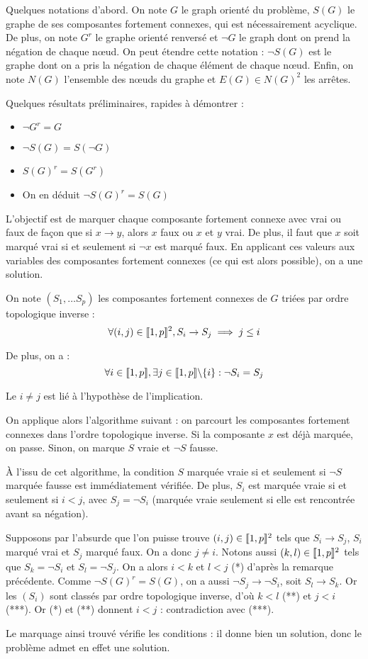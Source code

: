 Quelques notations d'abord. On note $G$ le graph orienté du problème, $S(G)$ le
graphe de ses composantes fortement connexes, qui est nécessairement acyclique.
De plus, on note $G^r$ le graphe orienté renversé et $\neg G$ le graph dont on
prend la négation de chaque nœud. On peut étendre cette notation : $\neg S(G)$
est le graphe dont on a pris la négation de chaque élément de chaque nœud.
Enfin, on note $N(G)$ l'ensemble des nœuds du graphe et $E(G) \in N(G)^2$ les
arrêtes.

Quelques résultats préliminaires, rapides à démontrer :
\begin{itemize}
 \item $\neg G^r = G$
 \item $\neg S(G) = S(\neg G)$
 \item $S(G)^r = S(G^r)$
 \item On en déduit $\neg S(G)^r = S(G)$
\end{itemize}

L'objectif est de marquer chaque composante fortement connexe avec vrai ou faux
de façon que si $x \rightarrow y$, alors $x$ faux ou $x$ et $y$ vrai. De plus,
il faut que $x$ soit marqué vrai si et seulement si $\neg x$ est marqué faux.
En applicant ces valeurs aux variables des composantes fortement connexes
(ce qui est alors possible), on a une solution.

On note $(S_1,\ldots S_p)$ les composantes fortement connexes de $G$ triées par
ordre topologique inverse :
    \[ \forall (i,j)\in\llbracket 1, p \rrbracket^2, S_i \rightarrow S_j \implies j \leq i \]

De plus, on a :
    \[ \forall i\in\llbracket 1, p \rrbracket, \exists j\in\llbracket 1, p \rrbracket\backslash\{i\}: \neg S_i = S_j \]

Le $i\neq j$ est lié à l'hypothèse de l'implication.

On applique alors l'algorithme suivant : on parcourt les composantes fortement
connexes dans l'ordre topologique inverse. Si la composante $x$ est déjà
marquée, on passe. Sinon, on marque $S$ vraie et $\neg S$ fausse.

À l'issu de cet algorithme, la condition $S$ marquée vraie si et seulement si
$\neg S$ marquée fausse est immédiatement vérifiée. De plus, $S_i$ est marquée
vraie si et seulement si $i < j$, avec $S_j = \neg S_i$ (marquée vraie
seulement si elle est rencontrée avant sa négation).

Supposons par l'absurde que l'on puisse trouve $(i,j)\in\llbracket 1, p \rrbracket^2$ tels que
$S_i\rightarrow S_j$, $S_i$ marqué vrai et $S_j$ marqué faux. On a donc
$j \neq i$. Notons aussi $(k,l)\in\llbracket 1, p \rrbracket^2$ tels que $S_k = \neg S_i$ et
$S_l = \neg S_j$. On a alors $i < k$ et $l < j$ (*) d'après la remarque
précédente. Comme $\neg S(G)^r = S(G)$, on a aussi $\neg S_j\rightarrow \neg S_i$,
soit $S_l\rightarrow S_k$. Or les $(S_i)$ sont classés par ordre topologique
inverse, d'où $k < l$ (**) et $j < i$ (***). Or (*) et (**) donnent $i < j$ :
contradiction avec (***).

Le marquage ainsi trouvé vérifie les conditions : il donne bien un solution,
donc le problème admet en effet une solution.

